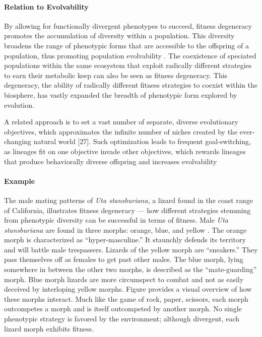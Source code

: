 \paragraph{Relation to Evolvability}
By allowing for functionally divergent phenotypes to succeed, fitness degeneracy promotes the accumulation of diversity within a population. This diversity broadens the range of phenotypic forms that are accessible to the offspring of a population, thus promoting population evolvability \mindmapmark{\populationevolvabilityfitnessdegeneracy}. The coexistence of speciated populations within the same ecosystem that exploit radically different strategies to earn their metabolic keep  
can also be seen as fitness degeneracy. This degeneracy, the ability of radically different fitness strategies to coexist within the biosphere, has vastly expanded the breadth of phenotypic form explored by evolution. 
\begin{displayquote}
 A related approach is to set a vast number of separate, diverse evolutionary objectives, which approximates the infinite number of niches created by the ever-changing natural world [27].  Such optimization leads to frequent goal-switching, as lineages fit on one objective invade other objectives, which rewards lineages that produce behaviorally diverse offspring and increases evolvability
\cite{Mengistu2016EvolvabilityIt}
\end{displayquote}

\paragraph{Example}
The male mating patterns of \textit{Uta stansburiana}, a lizard found in the coast range of California, illustrates fitness degeneracy --- how different strategies stemming from phenotypic diversity can be successful in terms of fitness. Male \textit{Uta stansburiana} are found in three morphs: orange, blue, and yellow \cite{Sinervo1996TheStrategies}. The orange morph is characterized as ``hyper-masculine.'' It staunchly defends its territory and will battle male trespassers. Lizards of the yellow morph are ``sneakers.'' They pass themselves off as females to get past other males. The blue morph, lying somewhere in between the other two morphs, is described as the ``mate-guarding'' morph. Blue morph lizards are more circumspect to combat and not as easily deceived by interloping yellow morphs. Figure  provides a visual overview of how these morphs interact. Much like the game of rock, paper, scissors, each morph outcompetes a morph and is itself outcompeted by another morph. No single phenotypic strategy is favored by the environment; although divergent, each lizard morph exhibits fitness.


